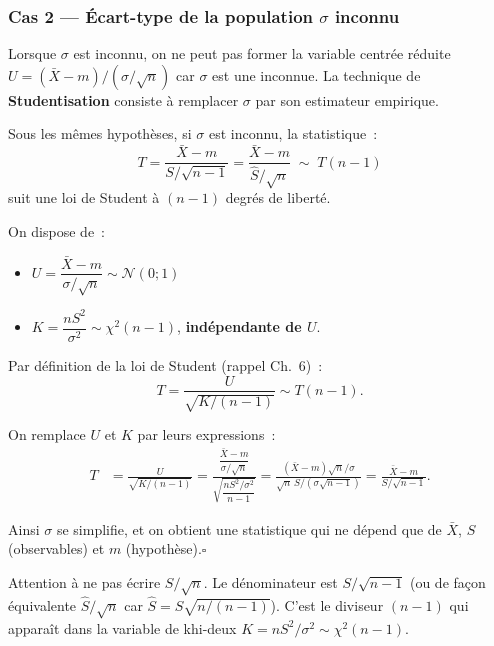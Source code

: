 \documentclass[11pt,a4paper]{article}
\newcommand{\N}{\mathcal{N}}
\begin{document}
\subsubsection{Cas 2 --- \'Ecart-type de la population $\sigma$ inconnu}

Lorsque $\sigma$ est inconnu, on ne peut pas former la variable centr\'ee r\'eduite $U = (\bar{X}-m)/(\sigma/\sqrt{n})$ car $\sigma$ est une inconnue. La technique de \textbf{Studentisation} consiste \`a remplacer $\sigma$ par son estimateur empirique.

\begin{thmbox}
Sous les m\^emes hypoth\`eses, si $\sigma$ est inconnu, la statistique~:
$$\boxed{T = \frac{\bar{X}-m}{S/\sqrt{n-1}} = \frac{\bar{X}-m}{\hat{S}/\sqrt{n}} \;\sim\; T(n-1)}$$
suit une loi de Student \`a $(n-1)$ degr\'es de libert\'e.
\end{thmbox}

\begin{demobox}
On dispose de~:
\begin{itemize}
  \item $U = \dfrac{\bar{X}-m}{\sigma/\sqrt{n}} \sim \N(0;1)$
  \item $K = \dfrac{nS^2}{\sigma^2} \sim \chi^2(n-1)$, \textbf{ind\'ependante de $U$}.
\end{itemize}

Par d\'efinition de la loi de Student (rappel Ch.~6)~:
$$T = \frac{U}{\sqrt{K/(n-1)}} \sim T(n-1).$$

On remplace $U$ et $K$ par leurs expressions~:
\begin{align*}
T &= \frac{U}{\sqrt{K/(n-1)}}
  = \frac{\dfrac{\bar{X}-m}{\sigma/\sqrt{n}}}{\sqrt{\dfrac{nS^2/\sigma^2}{n-1}}}
  = \frac{(\bar{X}-m)\sqrt{n}/\sigma}{\sqrt{n}\,S/(\sigma\sqrt{n-1})}
  = \frac{\bar{X}-m}{S/\sqrt{n-1}}.
\end{align*}

Ainsi $\sigma$ se simplifie, et on obtient une statistique qui ne d\'epend que de $\bar{X}$, $S$ (observables) et $m$ (hypoth\`ese).\hfill$\square$
\end{demobox}

\begin{alertbox}[Subtil\'et\'e : $T = (\bar{X}-m)/(S/\sqrt{n-1})$]
Attention \`a ne pas \'ecrire $S/\sqrt{n}$. Le d\'enominateur est $S/\sqrt{n-1}$ (ou de fa\c{c}on \'equivalente $\hat{S}/\sqrt{n}$ car $\hat{S}=S\sqrt{n/(n-1)}$). C'est le diviseur $(n-1)$ qui appara\^it dans la variable de khi-deux $K = nS^2/\sigma^2 \sim \chi^2(n-1)$.
\end{alertbox}
\end{document}
